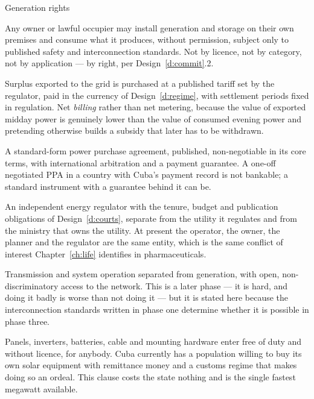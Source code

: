 \begin{design}{Generation rights}
\label{d:genrights}
\begin{rules}
 Any owner or lawful occupier may install generation and
storage on their own premises and consume what it produces, without permission,
subject only to published safety and interconnection standards. Not by licence,
not by category, not by application --- by right, per Design~\ref{d:commit}.2.

 Surplus exported to the grid is purchased at a published
tariff set by the regulator, paid in the currency of Design~\ref{d:regime}, with
settlement periods fixed in regulation. Net \emph{billing} rather than net
metering, because the value of exported midday power is genuinely lower than the
value of consumed evening power and pretending otherwise builds a subsidy that
later has to be withdrawn.

 A standard-form power purchase agreement,
published, non-negotiable in its core terms, with international arbitration and
a payment guarantee. A one-off negotiated PPA in a country with Cuba's payment
record is not bankable; a standard instrument with a guarantee behind it can be.

 An independent energy regulator with the tenure, budget and
publication obligations of Design~\ref{d:courts}, separate from the utility it
regulates and from the ministry that owns the utility. At present the operator,
the owner, the planner and the regulator are the same entity, which is the same
conflict of interest Chapter~\ref{ch:life} identifies in pharmaceuticals.

 Transmission and system operation separated from
generation, with open, non-discriminatory access to the network. This is a later
phase --- it is hard, and doing it badly is worse than not doing it --- but it
is stated here because the interconnection standards written in phase one
determine whether it is possible in phase three.

 Panels, inverters, batteries, cable and mounting hardware
enter free of duty and without licence, for anybody. Cuba currently has a
population willing to buy its own solar equipment with remittance money and a
customs regime that makes doing so an ordeal. This clause costs the state
nothing and is the single fastest megawatt available.
\end{rules}
\end{design}

